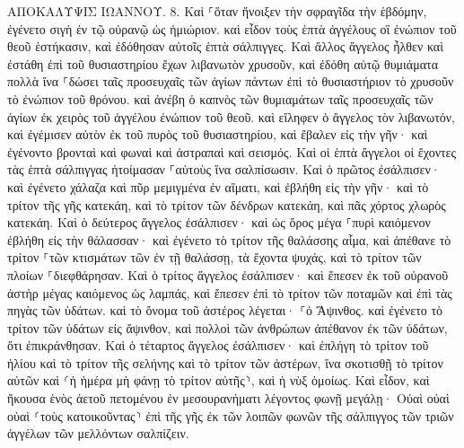 \documentclass[twoside, 9pt]{extreport}
\begin{document}
ΑΠΟΚΑΛΥΨΙΣ ΙΩΑΝΝΟΥ.
8.
Καὶ ⸀ὅταν ἤνοιξεν τὴν σφραγῖδα τὴν ἑβδόμην, ἐγένετο σιγὴ ἐν τῷ οὐρανῷ ὡς ἡμιώριον. 
καὶ εἶδον τοὺς ἑπτὰ ἀγγέλους οἳ ἐνώπιον τοῦ θεοῦ ἑστήκασιν, καὶ ἐδόθησαν αὐτοῖς ἑπτὰ σάλπιγγες. 
Καὶ ἄλλος ἄγγελος ἦλθεν καὶ ἐστάθη ἐπὶ τοῦ θυσιαστηρίου ἔχων λιβανωτὸν χρυσοῦν, καὶ ἐδόθη αὐτῷ θυμιάματα πολλὰ ἵνα ⸀δώσει ταῖς προσευχαῖς τῶν ἁγίων πάντων ἐπὶ τὸ θυσιαστήριον τὸ χρυσοῦν τὸ ἐνώπιον τοῦ θρόνου. 
καὶ ἀνέβη ὁ καπνὸς τῶν θυμιαμάτων ταῖς προσευχαῖς τῶν ἁγίων ἐκ χειρὸς τοῦ ἀγγέλου ἐνώπιον τοῦ θεοῦ. 
καὶ εἴληφεν ὁ ἄγγελος τὸν λιβανωτόν, καὶ ἐγέμισεν αὐτὸν ἐκ τοῦ πυρὸς τοῦ θυσιαστηρίου, καὶ ἔβαλεν εἰς τὴν γῆν· καὶ ἐγένοντο βρονταὶ καὶ φωναὶ καὶ ἀστραπαὶ καὶ σεισμός. 
Καὶ οἱ ἑπτὰ ἄγγελοι οἱ ἔχοντες τὰς ἑπτὰ σάλπιγγας ἡτοίμασαν ⸀αὑτοὺς ἵνα σαλπίσωσιν. 
Καὶ ὁ πρῶτος ἐσάλπισεν· καὶ ἐγένετο χάλαζα καὶ πῦρ μεμιγμένα ἐν αἵματι, καὶ ἐβλήθη εἰς τὴν γῆν· καὶ τὸ τρίτον τῆς γῆς κατεκάη, καὶ τὸ τρίτον τῶν δένδρων κατεκάη, καὶ πᾶς χόρτος χλωρὸς κατεκάη. 
Καὶ ὁ δεύτερος ἄγγελος ἐσάλπισεν· καὶ ὡς ὄρος μέγα ⸀πυρὶ καιόμενον ἐβλήθη εἰς τὴν θάλασσαν· καὶ ἐγένετο τὸ τρίτον τῆς θαλάσσης αἷμα, 
καὶ ἀπέθανε τὸ τρίτον ⸀τῶν κτισμάτων τῶν ἐν τῇ θαλάσσῃ, τὰ ἔχοντα ψυχάς, καὶ τὸ τρίτον τῶν πλοίων ⸀διεφθάρησαν. 
Καὶ ὁ τρίτος ἄγγελος ἐσάλπισεν· καὶ ἔπεσεν ἐκ τοῦ οὐρανοῦ ἀστὴρ μέγας καιόμενος ὡς λαμπάς, καὶ ἔπεσεν ἐπὶ τὸ τρίτον τῶν ποταμῶν καὶ ἐπὶ τὰς πηγὰς τῶν ὑδάτων. 
καὶ τὸ ὄνομα τοῦ ἀστέρος λέγεται· ⸀ὁ Ἄψινθος. καὶ ἐγένετο τὸ τρίτον τῶν ὑδάτων εἰς ἄψινθον, καὶ πολλοὶ τῶν ἀνθρώπων ἀπέθανον ἐκ τῶν ὑδάτων, ὅτι ἐπικράνθησαν. 
Καὶ ὁ τέταρτος ἄγγελος ἐσάλπισεν· καὶ ἐπλήγη τὸ τρίτον τοῦ ἡλίου καὶ τὸ τρίτον τῆς σελήνης καὶ τὸ τρίτον τῶν ἀστέρων, ἵνα σκοτισθῇ τὸ τρίτον αὐτῶν καὶ ⸂ἡ ἡμέρα μὴ φάνῃ τὸ τρίτον αὐτῆς⸃, καὶ ἡ νὺξ ὁμοίως. 
Καὶ εἶδον, καὶ ἤκουσα ἑνὸς ἀετοῦ πετομένου ἐν μεσουρανήματι λέγοντος φωνῇ μεγάλῃ· Οὐαὶ οὐαὶ οὐαὶ ⸂τοὺς κατοικοῦντας⸃ ἐπὶ τῆς γῆς ἐκ τῶν λοιπῶν φωνῶν τῆς σάλπιγγος τῶν τριῶν ἀγγέλων τῶν μελλόντων σαλπίζειν. 
\end{document}
